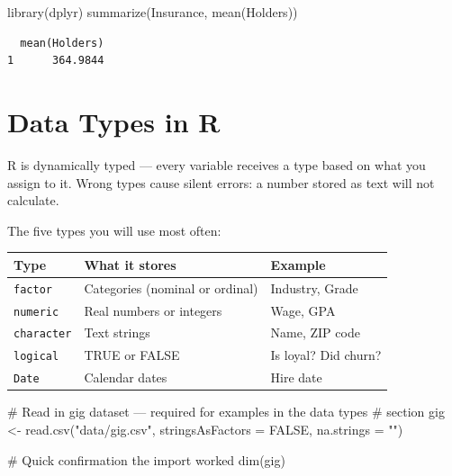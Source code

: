 \documentclass[
  letterpaper,
  DIV=11,
  numbers=noendperiod]{scrreprt}
\newenvironment{Shaded}{\begin{snugshade}}{\end{snugshade}}
\newcommand{\AttributeTok}[1]{\textcolor[rgb]{0.40,0.45,0.13}{#1}}
\newcommand{\CommentTok}[1]{\textcolor[rgb]{0.37,0.37,0.37}{#1}}
\newcommand{\ConstantTok}[1]{\textcolor[rgb]{0.56,0.35,0.01}{#1}}
\newcommand{\FunctionTok}[1]{\textcolor[rgb]{0.28,0.35,0.67}{#1}}
\newcommand{\NormalTok}[1]{\textcolor[rgb]{0.00,0.23,0.31}{#1}}
\newcommand{\OtherTok}[1]{\textcolor[rgb]{0.00,0.23,0.31}{#1}}
\newcommand{\StringTok}[1]{\textcolor[rgb]{0.13,0.47,0.30}{#1}}
\begin{document}
\begin{Shaded}
\begin{Highlighting}[]
\FunctionTok{library}\NormalTok{(dplyr)}
\FunctionTok{summarize}\NormalTok{(Insurance, }\FunctionTok{mean}\NormalTok{(Holders))}
\end{Highlighting}
\end{Shaded}

\begin{verbatim}
  mean(Holders)
1      364.9844
\end{verbatim}

\section{Data Types in R}\label{data-types-in-r}

R is dynamically typed --- every variable receives a type based on what
you assign to it. Wrong types cause silent errors: a number stored as
text will not calculate.

The five types you will use most often:

\begin{longtable}[]{@{}lll@{}}
\toprule\noalign{}
Type & What it stores & Example \\
\midrule\noalign{}
\endhead
\bottomrule\noalign{}
\endlastfoot
\texttt{factor} & Categories (nominal or ordinal) & Industry, Grade \\
\texttt{numeric} & Real numbers or integers & Wage, GPA \\
\texttt{character} & Text strings & Name, ZIP code \\
\texttt{logical} & TRUE or FALSE & Is loyal? Did churn? \\
\texttt{Date} & Calendar dates & Hire date \\
\end{longtable}

\begin{Shaded}
\begin{Highlighting}[]
\CommentTok{\# Read in gig dataset — required for examples in the data types}
\CommentTok{\# section}
\NormalTok{gig }\OtherTok{\textless{}{-}} \FunctionTok{read.csv}\NormalTok{(}\StringTok{"data/gig.csv"}\NormalTok{, }\AttributeTok{stringsAsFactors =} \ConstantTok{FALSE}\NormalTok{, }\AttributeTok{na.strings =} \StringTok{""}\NormalTok{)}

\CommentTok{\# Quick confirmation the import worked}
\FunctionTok{dim}\NormalTok{(gig)}
\end{Highlighting}
\end{Shaded}
\end{document}
